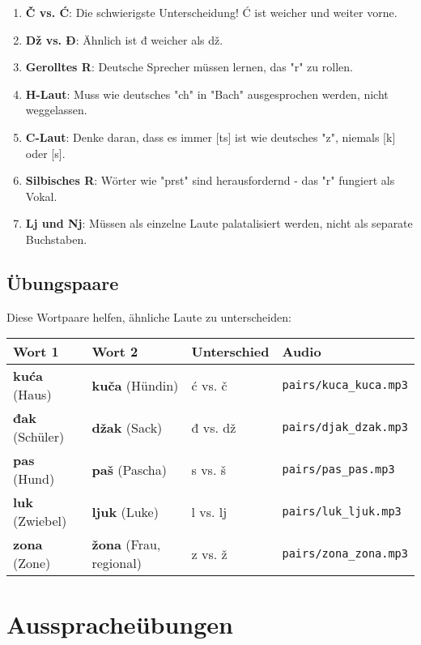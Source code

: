 \begin{enumerate}
    \item \textbf{Č vs. Ć}: Die schwierigste Unterscheidung! Ć ist weicher und weiter vorne.
    \item \textbf{Dž vs. Đ}: Ähnlich ist đ weicher als dž.
    \item \textbf{Gerolltes R}: Deutsche Sprecher müssen lernen, das "r" zu rollen.
    \item \textbf{H-Laut}: Muss wie deutsches "ch" in "Bach" ausgesprochen werden, nicht weggelassen.
    \item \textbf{C-Laut}: Denke daran, dass es immer [ts] ist wie deutsches "z", niemals [k] oder [s].
    \item \textbf{Silbisches R}: Wörter wie "prst" sind herausfordernd - das "r" fungiert als Vokal.
    \item \textbf{Lj und Nj}: Müssen als einzelne Laute palatalisiert werden, nicht als separate Buchstaben.
\end{enumerate}

\subsection{Übungspaare}

Diese Wortpaare helfen, ähnliche Laute zu unterscheiden:

\begin{center}
\begin{tabular}{llll}
\toprule
\textbf{Wort 1} & \textbf{Wort 2} & \textbf{Unterschied} & \textbf{Audio} \\
\midrule
\textbf{kuća} (Haus) & \textbf{kuča} (Hündin) & ć vs. č & \texttt{pairs/kuca\_kuca.mp3} \\
\textbf{đak} (Schüler) & \textbf{džak} (Sack) & đ vs. dž & \texttt{pairs/djak\_dzak.mp3} \\
\textbf{pas} (Hund) & \textbf{paš} (Pascha) & s vs. š & \texttt{pairs/pas\_pas.mp3} \\
\textbf{luk} (Zwiebel) & \textbf{ljuk} (Luke) & l vs. lj & \texttt{pairs/luk\_ljuk.mp3} \\
\textbf{zona} (Zone) & \textbf{žona} (Frau, regional) & z vs. ž & \texttt{pairs/zona\_zona.mp3} \\
\bottomrule
\end{tabular}
\end{center}

\section{Ausspracheübungen}

